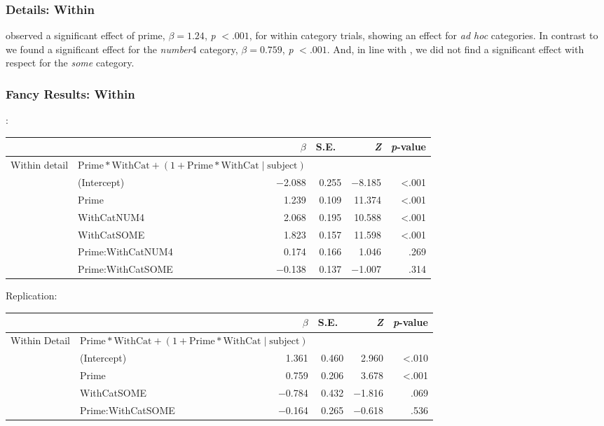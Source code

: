\documentclass[noamssymb]{beamer}
\begin{document}
\begin{frame}
  \frametitle{{\ftf Details: Within}}
  \citeauthor{Bott:2016aa} observed a significant effect of prime, \(\beta = 1.24\), \emph{p} \(< .001\), for within category trials, showing an effect for \emph{ad hoc} categories.
  In contrast to \citeauthor{Bott:2016aa} we found a significant effect for the \emph{number}4 category, \(\beta = 0.759\), \emph{p} \(< .001\).
  And, in line with \citeauthor{Bott:2016aa}, we did not find a significant effect with respect for the \emph{some} category.

\end{frame}

\begin{frame}

  \frametitle{{\ftf Fancy Results: Within}}

  \citeauthor{Bott:2016aa}:
    \begin{adjustbox}{width=1\textwidth,center=\textwidth}
    \begin{tabular}{llrrrr}
      \hline
      & & \(\beta\) & S.E.\ & \emph{Z} & \emph{p}-value  \\
      \hline
      Within detail & \multicolumn{2}{l}{\(\text{Prime} * \text{WithCat} + (1 + \text{Prime} * \text{WithCat} \mid \text{subject})\)}  & & & \\
      & (Intercept)  & \(-\)2.088 & 0.255 & \(-\)8.185 & <.001\\
      & Prime & 1.239 & 0.109 & 11.374 & <.001 \\
      & WithCatNUM4 & 2.068 & 0.195 & 10.588 & <.001 \\
      & WithCatSOME & 1.823 & 0.157 & 11.598 & <.001 \\
      & Prime:WithCatNUM4 & 0.174 & 0.166 & 1.046 & .269 \\
      & Prime:WithCatSOME & \(-\)0.138 & 0.137 & \(-\)1.007 & .314 \\

      \hline
    \end{tabular}
  \end{adjustbox}
Replication:
\begin{adjustbox}{width=1\textwidth,center=\textwidth}
    \begin{tabular}{llrrrr}
      \hline
      & & \(\beta\) & S.E.\ & \emph{Z} & \emph{p}-value  \\
      \hline
      Within Detail & \multicolumn{2}{l}{\(\text{Prime} * \text{WithCat} + (1 + \text{Prime} * \text{WithCat} \mid \text{subject})\)}  & & & \\
      & (Intercept)   &  1.361 & 0.460 &  2.960 & <.010 \\
      & Prime         &  0.759 & 0.206 &  3.678 & <.001 \\
      & WithCatSOME       & \(-\)0.784 & 0.432 & \(-\)1.816 & .069  \\
      & Prime:WithCatSOME & \(-\)0.164 & 0.265 & \(-\)0.618 & .536  \\
      \hline
    \end{tabular}
  \end{adjustbox}

\end{frame}
\end{document}
